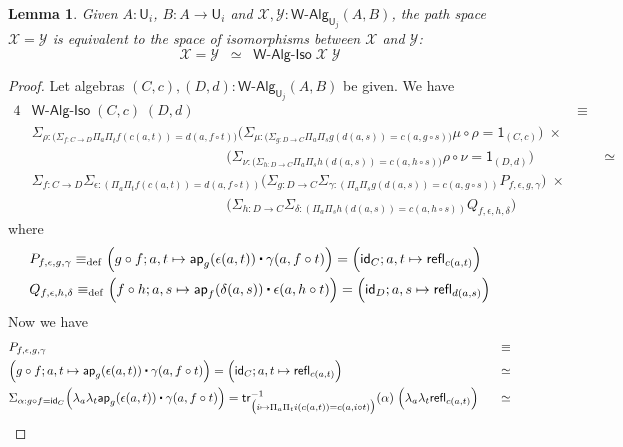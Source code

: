 \documentclass[reqno,10pt,a4paper,oneside]{amsart}
\numberwithin{equation}{section}
\theoremstyle{mythm}
\newtheorem{lemma}[theorem]{Lemma}
\theoremstyle{mydef}
\theoremstyle{myrmk}
\newcommand{\deq}{\equiv}
\newcommand{\defeq}{\deq_{\mathrm{def}}}
\newcommand{\idfun}[1]{\mathsf{id}_{#1}}
\newcommand{\comp}{\circ}
\newcommand{\trans}{\mathsf{tr}}
\newcommand{\ct}{%
  \mathchoice{\mathbin{\raisebox{0.5ex}{$\displaystyle\centerdot$}}}%
             {\mathbin{\raisebox{0.5ex}{$\centerdot$}}}%
             {\mathbin{\raisebox{0.25ex}{$\scriptstyle\,\centerdot\,$}}}%
             {\mathbin{\raisebox{0.1ex}{$\scriptscriptstyle\,\centerdot\,$}}}}
\newcommand{\prd}[1]{\Pi_{#1}}
\newcommand{\sm}[1]{\Sigma_{#1}}
\newcommand{\lam}[1]{\lambda_{#1}}
\newcommand{\app}{\mathsf{ap}}
\newcommand{\refl}{\mathsf{refl}}
\newcommand{\one}{\mathsf{1}}
\newcommand{\UU}{\mathsf{U}}
\newcommand{\WAlg}{\mathsf{W}\text{-}\mathsf{Alg}}
\newcommand{\WAlgIso}{\mathsf{W}\text{-}\mathsf{Alg}\text{-}\mathsf{Iso}}
\newcommand{\X}{\mathcal{X}}
\newcommand{\Y}{\mathcal{Y}}
\begin{document}
\begin{lemma}\label{WAlgSpace}
Given $A:\UU_i$, $B : A \to \UU_i$ and $\X,\Y : \WAlg_{\UU_j}(A,B)$, the path space $\X = \Y$ is equivalent to the space of isomorphisms between $\X$ and $\Y$:
\[ \X = \Y \;\; \simeq \;\; \WAlgIso \; \X \; \Y \] 
\end{lemma}
\begin{proof}
Let algebras $(C,c), (D,d) : \WAlg_{\UU_j}(A,B)$ be given. We have
\begin{alignat*}{4}
& \WAlgIso \; (C,c) \; (D,d) & \equiv \\
& \sm{\rho : \big(\sm{f:C\to D} \prd{a}\prd{t} f(c(a,t)) = d(a,f \comp t) \big)} \Big(\sm{\mu : \big(\sm{g:D\to C} \prd{a}\prd{s} g(d(a,s)) = c(a,g \comp s)\big)} \mu \comp \rho = \one_{(C,c)} \Big)\; \times & \\
& \;\;\;\;\;\;\;\;\;\;\;\;\;\;\;\;\;\;\;\;\;\;\;\;\;\;\;\;\;\;\;\;\;\;\;\;\;\;\;\;\;\;\;\;\;\;\;\;\;\;\Big(\sm{\nu : \big(\sm{h:D\to C} \prd{a}\prd{s} h(d(a,s))=c(a,h\comp s)\big)} \rho \comp \nu = \one_{(D,d)}\Big) & \;\;\;\;\;\;\; \simeq \\
& \sm{f : C\to D} \sm{\epsilon : (\prd{a}\prd{t} f(c(a,t)) = d(a,f \comp t))} \Big(\sm{g:D\to C} \sm{\gamma : (\prd{a}\prd{s} g(d(a,s)) = c(a,g \comp s))} P_{f,\epsilon,g,\gamma}\Big) \; \times & \\
& \;\;\;\;\;\;\;\;\;\;\;\;\;\;\;\;\;\;\;\;\;\;\;\;\;\;\;\;\;\;\;\;\;\;\;\;\;\;\;\;\;\;\;\;\;\;\;\;\;\; \Big(\sm{h:D\to C} \sm{\delta : (\prd{a}\prd{s} h(d(a,s))=c(a,h\comp s))} Q_{f,\epsilon,h,\delta} \Big) &
\end{alignat*}
where
\begin{align*}
& P_{f,\epsilon,g,\gamma} \defeq \Big(g \comp f; a,t \mapsto \app_g(\epsilon(a,t)) \ct \gamma(a, f \comp t)\Big) = \Big(\idfun{C}; a,t \mapsto \refl_{c(a,t)}\Big) \\
& Q_{f,\epsilon,h,\delta} \defeq \Big(f \comp h; a,s \mapsto \app_f(\delta(a,s)) \ct \epsilon(a, h \comp t)\Big) = \Big(\idfun{D}; a,s \mapsto \refl_{d(a,s)}\Big)
\end{align*}
Now we have
\begin{alignat*}{4}
& P_{f,\epsilon,g,\gamma} & \equiv \\
& \Big(g \comp f; a,t \mapsto \app_g(\epsilon(a,t)) \ct \gamma(a, f \comp t)\Big) = \Big(\idfun{C}; a,t \mapsto \refl_{c(a,t)}\Big) & \simeq \\
& \sm{\alpha : g \comp f = \idfun{C}} \Big(\lam{a}\lam{t} \app_g(\epsilon(a,t)) \ct \gamma(a, f \comp t)\Big) = \trans^{-1}_{\big(i \mapsto \prd{a}\prd{t} i(c(a,t)) = c(a,i \comp t)\big)}(\alpha) \; \Big(\lam{a}\lam{t} \refl_{c(a,t)}\Big) & \;\;\; \simeq \\

\end{alignat*}
\end{proof}
\end{document}
